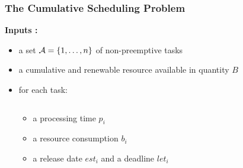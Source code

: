 

\begin{frame}
  \frametitle{The Cumulative Scheduling Problem} 
\vspace{0.1cm}
 \textbf{Inputs : }
\vspace{0.15cm}
  \begin{itemize}
  \item a set ${\cal A}=\{1,\dots ,n\}$ of non-preemptive tasks
\vspace{0.15cm}
    \item a cumulative and renewable resource available in quantity $B$
\vspace{0.15cm}
    \item<2-> for each task:
      \vspace{-1cm}
      \begin{columns}
        \hfill
        \begin{column}{0.36\linewidth}
          \begin{itemize}
          \item<2-> \footnotesize  a processing time $p_i$
          \item<3-> \footnotesize a resource consumption $b_i$ 
          \item<4-> \footnotesize a release date $est_i$ and a deadline $let_i$ 
          \end{itemize}
        \end{column}
        \begin{column}{0.7\linewidth}
          \centering
          
      \end{column} 
    \end{columns}
  \end{itemize}
\vspace{-0.5cm}
\end{frame}


